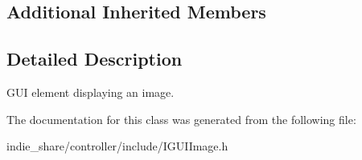 \subsection*{Additional Inherited Members}


\subsection{Detailed Description}
G\+UI element displaying an image. 

The documentation for this class was generated from the following file\+:\begin{DoxyCompactItemize}
\item 
indie\+\_\+share/controller/include/I\+G\+U\+I\+Image.\+h\end{DoxyCompactItemize}
